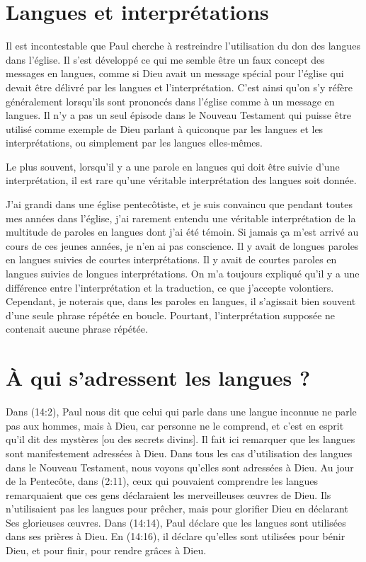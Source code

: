 \section{Langues et interpr\'etations}

Il est incontestable que Paul cherche à restreindre l'utilisation
 du don des langues dans l'église. Il s'est développé ce qui me semble
 être un faux concept des \og messages \fg{} en langues,
 comme si Dieu avait un message spécial pour l'église qui devait être délivré
 par les langues et l'interprétation. C'est ainsi qu'on s'y réfère
 généralement lorsqu'ils sont prononcés dans l'église
 \ocadr comme à un message en langues.
 Il n'y a pas un seul épisode dans le Nouveau Testament
 qui puisse être utilisé comme exemple de Dieu parlant à quiconque
 par les langues et les interprétations, ou simplement par les langues
 elles-mêmes.

Le plus souvent, lorsqu'il y a une parole en langues qui doit être suivie
 d'une interprétation, il est rare qu'une véritable interprétation
 des langues soit donnée.

J'ai grandi dans une église pentecôtiste, et je suis convaincu que pendant
 toutes mes années dans l'église, j'ai rarement entendu une véritable
 interprétation de la multitude de paroles en langues dont j'ai été témoin.
 Si jamais ça m'est arrivé au cours de ces jeunes années, je n'en ai pas conscience.
 Il y avait de longues paroles en langues suivies de courtes interprétations.
 Il y avait de courtes paroles en langues suivies de longues interprétations.
 On m'a toujours expliqué qu'il y a une différence entre l'interprétation
 et la traduction, ce que j'accepte volontiers. Cependant, je noterais que,
 dans les paroles en langues, il s'agissait bien souvent d'une seule phrase
 répétée en boucle. Pourtant, l'interprétation supposée ne contenait aucune phrase
 répétée.


\section{\`A qui s'adressent les langues ?}


\begin{specialpar}{}
Dans (14:2), Paul nous dit que celui qui parle dans une
 langue inconnue \og ne parle pas aux hommes, mais à Dieu, car personne
 ne le comprend, et c'est en esprit qu'il dit des mystères
 [ou des secrets divins]. \fg{} Il fait ici remarquer que les langues
 sont manifestement adressées à Dieu. Dans tous les cas d'utilisation
 des langues dans le Nouveau Testament, nous voyons qu'elles sont adressées
 à Dieu. Au jour de la Pentecôte, dans (2:11),
 ceux qui pouvaient comprendre les langues remarquaient que ces gens
 déclaraient les merveilleuses œuvres de Dieu. Ils n'utilisaient pas
 les langues pour prêcher, mais pour glorifier Dieu
 en déclarant Ses glorieuses œuvres.
 Dans (14:14), Paul déclare que les langues sont utilisées
 dans ses prières à Dieu. En (14:16), il déclare
 qu'elles sont utilisées pour bénir Dieu, et pour finir,
 pour rendre grâces à Dieu.
\end{specialpar}

